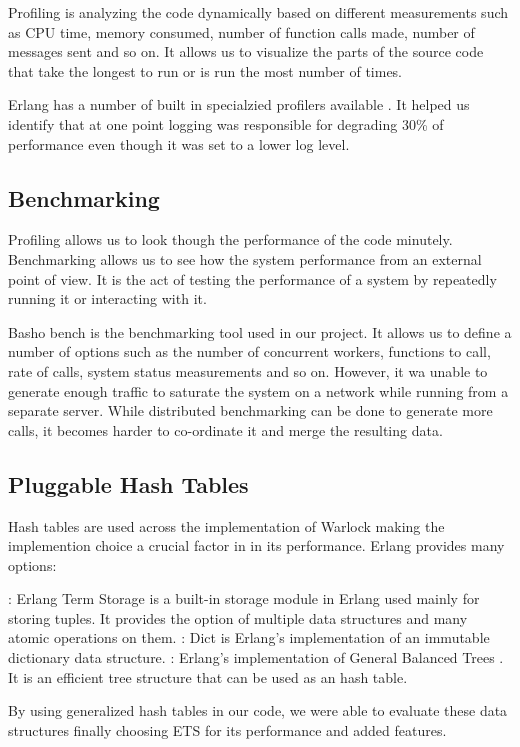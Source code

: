 Profiling is analyzing the code dynamically based on different measurements such
as CPU time, memory consumed, number of function calls made, number of messages
sent and so on. It allows us to visualize the parts of the source code that take
the longest to run or is run the most number of times.

Erlang has a number of built in specialzied profilers available
\citep{erlang.profiling}. It helped us identify that at one point logging was
responsible for degrading 30\% of performance even though it was set to a
lower log level.

\subsection{Benchmarking}

Profiling allows us to look though the performance of the code minutely.
Benchmarking allows us to see how the system performance from an external
point of view. It is the act of testing the performance of a system by
repeatedly running it or interacting with it.

Basho bench \citep{basho.bench} is the benchmarking tool used in our project.
It allows us to define a number of options such as the number of concurrent
workers, functions to call, rate of calls, system status measurements and so
on. However, it wa unable to generate enough traffic to saturate the system
on a network while running from a separate server. While distributed
benchmarking can be done to generate more calls, it becomes harder to
co-ordinate it and merge the resulting data.

\subsection{Pluggable Hash Tables}

Hash tables are used across the implementation of Warlock making the
implemention choice a crucial factor in in its performance. Erlang provides
many options:

\begin{itemize}
    : Erlang Term Storage is a built-in storage module in Erlang
    used mainly for storing tuples. It provides the option of multiple data
    structures and many atomic operations on them.
    : Dict is Erlang's implementation of an immutable dictionary
    data structure.
    : Erlang's implementation of General Balanced Trees
    \citep{Andersson99}. It is an efficient tree structure that can be used
    as an hash table.
\end{itemize}

By using generalized hash tables in our code, we were able to evaluate these
data structures finally choosing ETS for its performance and added features.
